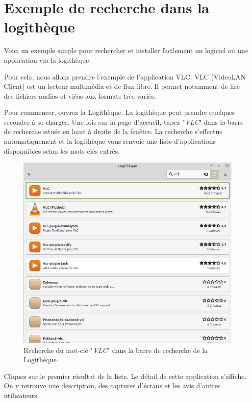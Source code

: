 \documentclass[12pt]{book}
\begin{document}
\section{Exemple de recherche dans la logithèque}\label{sec:exlogitheque}
	Voici un exemple simple pour rechercher et installer facilement un logiciel ou une application via la logithèque.\par
	Pour cela, nous allons prendre l'exemple de l'application VLC.
	VLC (VideoLAN Client) est un lecteur multimédia et de flux libre.
	Il permet notamment de lire des fichiers audios et viéos aux formats très variés.\par
	Pour commencer, ouvrez la Logithèque.
	La logithèque peut prendre quelques secondes à se charger.
	Une fois sur la page d'accueil, tapez "\textit{VLC}" dans la barre de recherche située en haut à droite de la fenêtre.
	La recherche s'effectue automatiquement et la logithèque vous renvoie une liste d'applications disponnibles selon les mots-clés entrés.
	\begin{figure}[h]
		\centering
		\includegraphics[width=.8\textwidth]{include/vlc1.png}
		\caption{Recherche du mot-clé "\textit{VLC}" dans la barre de recherche de la Logithèque}
		\label{fig:vlc1}
	\end{figure}\par
	Cliquez sur le premier résultat de la liste.
	Le détail de cette application s'affiche.
	On y retrouve une description, des captures d'écrans et les avis d'autres utilisateurs.
\end{document}
